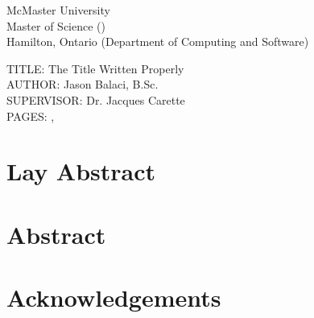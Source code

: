 \documentclass[12pt,oneside]{book}
\begin{document}
\setcounter{page}{2} %

\noindent
McMaster University \\
Master of Science (\the\year{}) \\
Hamilton, Ontario (Department of Computing and Software)

\vspace{2cm}

\noindent
TITLE: The Title Written Properly \\
AUTHOR: Jason Balaci, B.Sc. \\
SUPERVISOR: Dr. Jacques Carette \\
PAGES: \pageref{lastOfFrontMatter}, \pageref{LastPage}

\newpage


\chapter*{Lay Abstract}



\chapter{Abstract}



\chapter{Acknowledgements}



\tableofcontents

\end{document}

